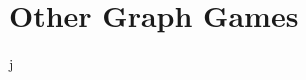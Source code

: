 \documentclass{beamer}
\begin{document}
\section{Other Graph Games}


\begin{frame}{\secname}
    j
\end{frame}
\end{document}
